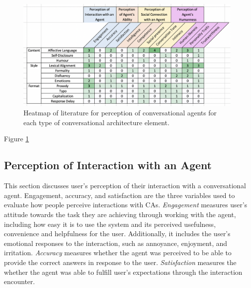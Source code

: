 \documentclass[sigconf,screen,review, anonymous]{acmart}
\begin{document}
\begin{figure}[h]
  \centering
  \includegraphics[width=\textwidth]{heatmap.png}
  \caption{Heatmap of literature for perception of conversational agents for each type of conversational architecture element.}
  \label{fig:heatmap}
\end{figure}

Figure \ref{fig:heatmap}


\subsection{Perception of Interaction with an Agent}

This section discusses user's perception of their interaction with a conversational agent. Engagement, accuracy, and satisfaction are the three variables used to evaluate how people perceive interactions with CAs. \textit{Engagement} measures user's attitude towards the task they are achieving through working with the agent, including how easy it is to use the system and its perceived usefulness, convenience and helpfulness for the user. Additionally, it includes the user's emotional responses to the interaction, such as annoyance, enjoyment, and irritation. \textit{Accuracy} measures whether the agent was perceived to be able to provide the correct answers in response to the user. \textit{Satisfaction} measures the whether the agent was able to fulfill user's expectations through the interaction encounter.
\end{document}
